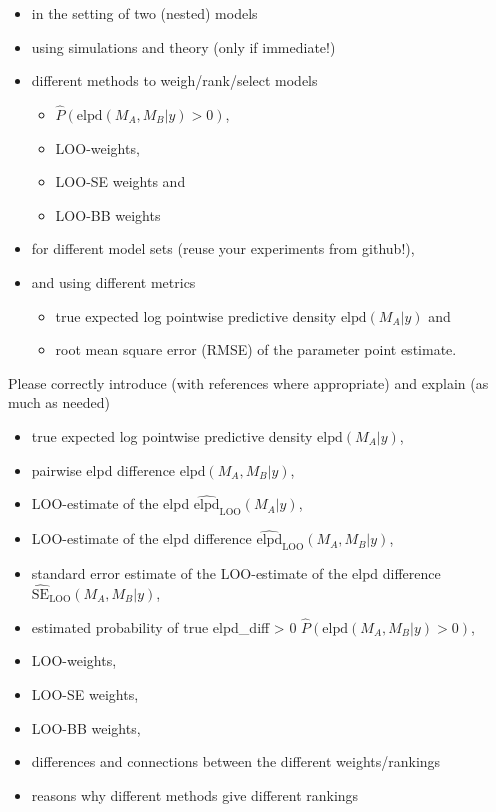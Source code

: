 \begin{itemize}
\tightlist
\item
  in the setting of two (nested) models
\item
  using simulations and theory (only if immediate!)
\item
  different methods to weigh/rank/select models

  \begin{itemize}
  \tightlist
  \item
    \(\widehat{P}(\mathrm{elpd}(M_A, M_B | y) > 0)\),
  \item
    LOO-weights,
  \item
    LOO-SE weights and
  \item
    LOO-BB weights
  \end{itemize}
\item
  for different model sets (reuse your experiments from github!),
\item
  and using different metrics

  \begin{itemize}
  \tightlist
  \item
    true expected log pointwise predictive density
    \(\mathrm{elpd}(M_A | y)\) and
  \item
    root mean square error (RMSE) of the parameter point estimate.
  \end{itemize}
\end{itemize}

Please correctly introduce (with references where appropriate) and
explain (as much as needed)

\begin{itemize}
\tightlist
\item
  true expected log pointwise predictive density
  \(\mathrm{elpd}(M_A | y)\),
\item
  pairwise elpd difference \(\mathrm{elpd}(M_A, M_B | y)\),
\item
  LOO-estimate of the elpd
  \(\widehat{\mathrm{elpd}}_\mathrm{LOO}(M_A | y)\),
\item
  LOO-estimate of the elpd difference
  \(\widehat{\mathrm{elpd}}_\mathrm{LOO}(M_A, M_B | y)\),
\item
  standard error estimate of the LOO-estimate of the elpd difference
  \(\widehat{\mathrm{SE}}_\mathrm{LOO}(M_A, M_B | y)\),
\item
  estimated probability of true elpd\_diff \textgreater{} 0
  \(\widehat{P}(\mathrm{elpd}(M_A, M_B | y) > 0)\),
\item
  LOO-weights,
\item
  LOO-SE weights,
\item
  LOO-BB weights,
\item
  differences and connections between the different weights/rankings
\item
  reasons why different methods give different rankings
\end{itemize}

